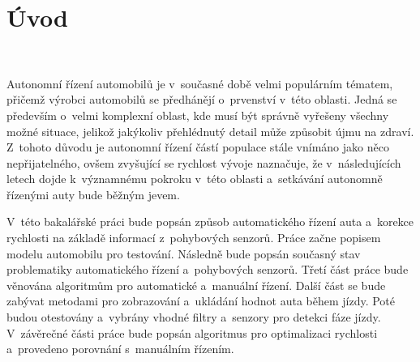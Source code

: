 \chapter*{Úvod}
\label{sec:Introduction}
\

Autonomní řízení automobilů je v~současné době velmi populárním tématem, přičemž
výrobci automobilů se předhánějí o~prvenství v~této oblasti. Jedná se především
o~velmi komplexní oblast, kde musí být správně vyřešeny všechny možné situace, jelikož
jakýkoliv přehlédnutý detail může způsobit újmu na zdraví. Z~tohoto důvodu je
autonomní řízení částí populace stále vnímáno jako něco  nepřijatelného, ovšem
zvyšující se rychlost vývoje naznačuje, že v~následujících letech dojde k~významnému
pokroku v~této oblasti a~setkávání autonomně řízenými auty bude běžným jevem.

V~této bakalářské práci bude popsán způsob automatického řízení auta a~korekce rychlosti na základě informací z~pohybových senzorů. Práce začne popisem modelu automobilu pro testování. Následně bude popsán současný stav problematiky automatického řízení a~pohybových senzorů. Třetí část práce bude věnována algoritmům pro automatické a~manuální řízení. Další část se bude zabývat metodami pro zobrazování a~ukládání hodnot auta během jízdy. Poté budou otestovány a~vybrány vhodné filtry a~senzory pro detekci fáze jízdy. V~závěrečné části práce bude popsán algoritmus pro optimalizaci rychlosti a~provedeno porovnání s~manuálním řízením.

\endinput
